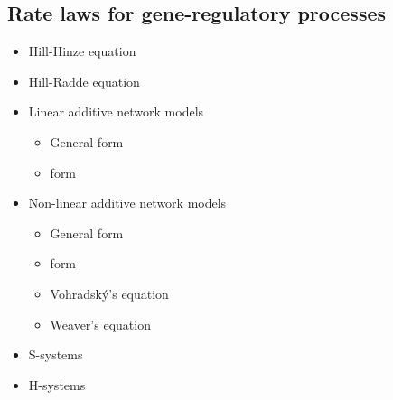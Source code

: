 \subsection{Rate laws for gene-regulatory processes}
\begin{itemize}
  \item Hill-Hinze equation \citep{Hinze2007}
  \item Hill-Radde equation \citep{Radde2007a, Radde2007}
  \item Linear additive network models
    \begin{itemize}
      \item General form
      \item \NetGenerator form \citep{Toepfer2007}
    \end{itemize}
  \item Non-linear additive network models
    \begin{itemize}
      \item General form
      \item \NetGenerator form \citep{Toepfer2007}
      \item Vohradsk{\'y}'s equation \citep{Vu2007}
      \item Weaver's equation \citep{Weaver1999}
    \end{itemize}
  \item S-systems \citep{Savageau1969, spieth04optimizing, Tournier2005, Spieth2006, Hecker2009}
  \item H-systems \citep{Spieth2006}
\end{itemize}

